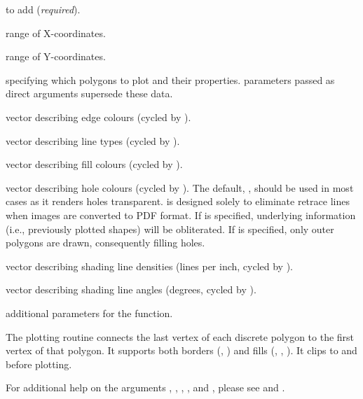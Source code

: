 \documentclass[letterpaper]{book}
\begin{document}
\begin{Arguments}
\begin{ldescription}
\item[\code{polys}]  to add (\emph{required}).
\item[\code{xlim}] range of X-coordinates.
\item[\code{ylim}] range of Y-coordinates.
\item[\code{polyProps}]  specifying which polygons to plot and their
properties.   parameters passed as direct arguments
supersede these data.
\item[\code{border}] vector describing edge colours (cycled by ).
\item[\code{lty}] vector describing line types (cycled by ).
\item[\code{col}] vector describing fill colours (cycled by ).
\item[\code{colHoles}] vector describing hole colours (cycled by ).
The default, , should be used in most cases as it renders holes 
transparent.  is designed solely to eliminate retrace lines 
when images are converted to PDF format. If  is specified, 
underlying information (i.e., previously plotted shapes) will be obliterated.
If  is specified, only outer polygons are drawn, consequently filling holes.
\item[\code{density}] vector describing shading line densities (lines per
inch, cycled by ).
\item[\code{angle}] vector describing shading line angles (degrees, cycled by
).
\item[\code{...}] additional  parameters for the
 function.
\end{ldescription}
\end{Arguments}
%
\begin{Details}\relax
The plotting routine connects the last vertex of each discrete polygon
to the first vertex of that polygon.  It supports both
borders (, ) and fills (,
, ). It clips  to 
and  before plotting.

For additional help on the arguments , ,
, , and , please see
 and .
\end{Details}
\end{document}
